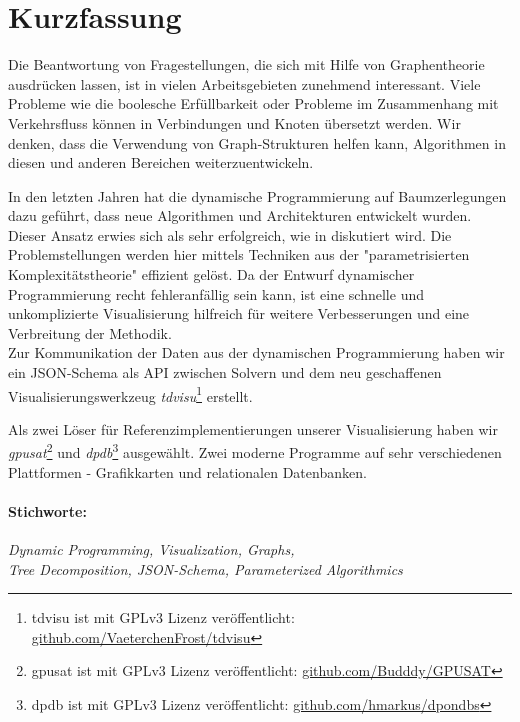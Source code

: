 \documentclass[a4paper, 12pt, bibliography=totoc]{scrartcl}
\begin{document}
\section*{Kurzfassung}

\vspace{4ex}

Die Beantwortung von Fragestellungen, die sich mit Hilfe von Graphentheorie ausdrücken lassen, ist in vielen Arbeitsgebieten zunehmend interessant.
Viele Probleme wie die boolesche Erfüllbarkeit oder Probleme im Zusammenhang mit  Verkehrsfluss können in Verbindungen und Knoten übersetzt werden.
Wir denken, dass die Verwendung von Graph-Strukturen helfen kann, Algorithmen in diesen und anderen Bereichen weiterzuentwickeln.

In den letzten Jahren hat die dynamische Programmierung auf Baumzerlegungen dazu geführt, dass neue Algorithmen und Architekturen entwickelt wurden. Dieser Ansatz erwies sich als sehr erfolgreich, wie in \cite{fichtegpusat2} diskutiert wird. Die Problemstellungen werden hier mittels Techniken aus der "parametrisierten Komplexitätstheorie" \cite[S. 2]{dpdbpadl2020} effizient gelöst.
Da der Entwurf dynamischer Programmierung recht fehleranfällig sein kann, ist eine schnelle und unkomplizierte Visualisierung hilfreich für weitere Verbesserungen und eine Verbreitung der Methodik.\\

Zur Kommunikation der Daten aus der dynamischen Programmierung
haben wir ein JSON-Schema als API zwischen Solvern und dem neu geschaffenen Visualisierungswerkzeug \textit{tdvisu}\footnote{tdvisu ist mit GPLv3 Lizenz veröffentlicht: \url{github.com/VaeterchenFrost/tdvisu}} erstellt.

Als zwei Löser für Referenzimplementierungen unserer Visualisierung haben wir \textit{gpusat}\footnote{gpusat ist mit GPLv3 Lizenz veröffentlicht: \url{github.com/Budddy/GPUSAT}} und \textit{dpdb}\footnote{dpdb ist mit GPLv3 Lizenz veröffentlicht: \url{github.com/hmarkus/dpondbs}} ausgewählt. Zwei moderne Programme auf sehr verschiedenen Plattformen - Grafikkarten und relationalen Datenbanken.\\

\paragraph{Stichworte:}
\textit{Dynamic Programming, Visualization, Graphs, \\
	Tree Decomposition, JSON-Schema, Parameterized Algorithmics 
}\leftskip=1.6cm \rightskip=1cm
\end{document}
